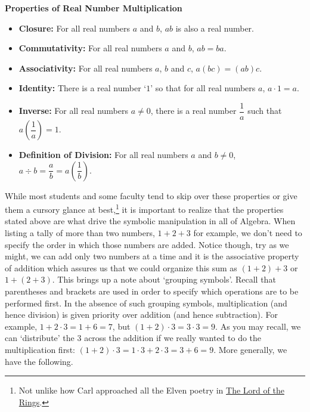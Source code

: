 \documentclass{ximera}
\begin{document}
\medskip

\label{realnumbermultiplication}


\centerline{\textbf{Properties of Real Number Multiplication}}

\begin{itemize}

\item  \textbf{Closure:}  For all real numbers $a$ and $b$,  $ab$ is also a real number.

\item  \textbf{Commutativity:}  For all real numbers $a$ and $b$, $ab = ba$.

\item  \textbf{Associativity:}  For all real numbers $a$, $b$ and $c$, $a(bc) = (ab)c$.

\item  \textbf{Identity:}  There is a real number `$1$' so that for all real numbers $a$, $a \cdot 1 = a$.

\item  \textbf{Inverse:}  For all real numbers $a \neq 0$, there is a real number $\dfrac{1}{a}$ such that $a \left(\dfrac{1}{a}\right) = 1$.

\item \textbf{Definition of Division:}  For all real numbers $a$ and $b \neq 0$, $a \div b = \dfrac{a}{b} = a  \left(\dfrac{1}{b}\right)$.

\end{itemize}


\medskip

While most students and some faculty tend to skip over these properties or give them a cursory glance at best,\footnote{Not unlike how Carl approached all the Elven poetry in \underline{The Lord of the Rings}.} it is important to realize that the properties stated above are what drive the symbolic manipulation in all of Algebra.  When listing a tally of more than two numbers, $1 + 2 + 3$\label{howtoaddonetwothree} for example, we don't need to specify the order in which those numbers are added. Notice though, try as we might, we can add only two numbers at a time and it is the associative property of addition which assures us that we could organize this sum as $(1+2) + 3$ or $1+(2+3)$.  This brings up a note about `grouping symbols'.  Recall that parentheses and brackets are used in order to specify which operations are to be performed first.  In the absence of such grouping symbols, multiplication (and hence division) is given priority over addition (and hence subtraction). For example, $1 + 2 \cdot 3 = 1+6 = 7$, but $(1+2) \cdot 3 = 3 \cdot 3 = 9$.  As you may recall, we can `distribute' the $3$ across the addition if we really wanted to do the multiplication first:  $(1+2) \cdot 3 = 1\cdot 3 + 2 \cdot 3 = 3 + 6 = 9$. More generally, we have the following.
\end{document}
